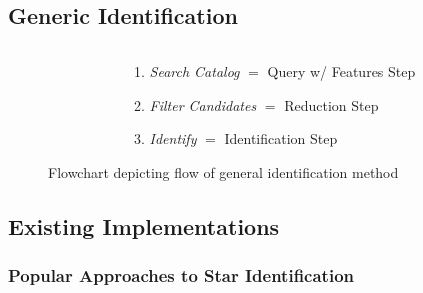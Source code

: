 \documentclass[11pt]{beamer}
\begin{document}
    \subsection{Generic Identification}\label{subsec:genericIdentification}
    \begin{frame}
        \begin{figure}
            \begin{columns}
                \begin{column}{0.4\linewidth}
                    \centering{\scalebox{.53}{}}
                \end{column}
                \begin{column}{0.6\linewidth}
                    \caption{Flowchart depicting flow of general identification method} \bigskip
                    \begin{enumerate}
                        \item \textit{Search Catalog} $=$ Query w/ Features Step \medskip
                        \item \textit{Filter Candidates} $=$ Reduction Step \medskip
                        \item \textit{Identify} $=$ Identification Step \medskip
                    \end{enumerate}
                \end{column}
            \end{columns}
        \end{figure}
    \end{frame}

    \subsection{Existing Implementations}\label{subsec:existingImplementations}
    \begin{frame}
        \frametitle{Popular Approaches to Star Identification}
        \begin{table}
            \centering{\tiny\hspace*{-10pt}} \bigskip \bigskip
        \end{table}
    \end{frame}
\end{document}
